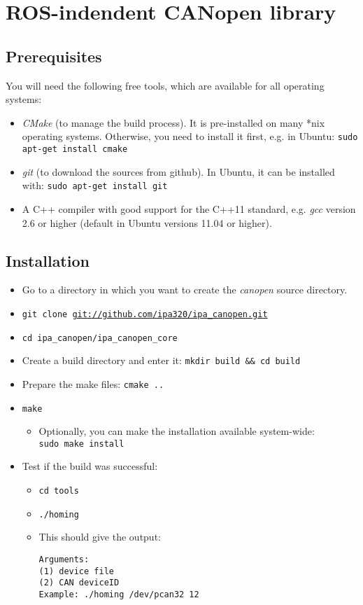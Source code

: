  \section{ROS-indendent CANopen library}
\label{chap:installation:canopen}

\subsection{Prerequisites}

You will need the following free tools, which are available for all operating systems:
\begin{itemize}
\item {\em CMake} (to manage the build process). It is pre-installed on many *nix operating systems. Otherwise, you need to install it first, e.g. in Ubuntu:
\texttt{sudo apt-get install cmake}
\item {\em git} (to download the sources from github). In Ubuntu, it can be installed with: \texttt{sudo apt-get install git}
\item A C++ compiler with good support for the C++11 standard, e.g. {\em gcc} version 2.6 or higher (default in Ubuntu versions 11.04 or higher).
\end{itemize}

\subsection{Installation}

\begin{itemize}
\item Go to a directory in which you want to create the {\em canopen} source directory.
\item \texttt{git clone \url{git://github.com/ipa320/ipa_canopen.git}}
\item \texttt{cd ipa\_canopen/ipa\_canopen\_core}
\item Create a build directory and enter it: \texttt{mkdir build \&\& cd build}
\item Prepare the make files: \texttt{cmake ..}
\item \texttt{make}
\begin{itemize}
\item Optionally, you can make the installation available system-wide: \\
\texttt{sudo make install}
\end{itemize}
\item Test if the build was successful:
\begin{itemize} 
\item \texttt{cd tools}
\item \texttt{./homing}
\item This should give the output:
{\scriptsize
\begin{verbatim}
Arguments:
(1) device file
(2) CAN deviceID
Example: ./homing /dev/pcan32 12
\end{verbatim}}
\end{itemize}
\end{itemize}

